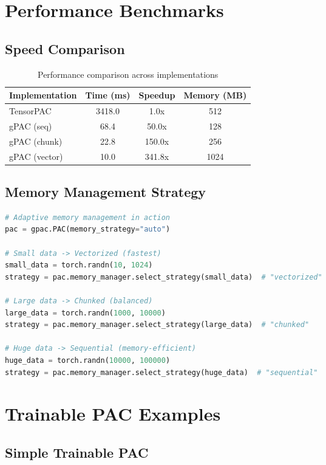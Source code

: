 \documentclass[11pt,a4paper]{article}
\begin{document}
\section{Performance Benchmarks}

\subsection{Speed Comparison}

\begin{table}[h]
\centering
\begin{tabular}{lccc}
\toprule
Implementation & Time (ms) & Speedup & Memory (MB) \\
\midrule
TensorPAC & 3418.0 & 1.0x & 512 \\
gPAC (seq) & 68.4 & 50.0x & 128 \\
gPAC (chunk) & 22.8 & 150.0x & 256 \\
gPAC (vector) & 10.0 & 341.8x & 1024 \\
\bottomrule
\end{tabular}
\caption{Performance comparison across implementations}
\end{table}

\subsection{Memory Management Strategy}

\begin{lstlisting}[language=Python]
# Adaptive memory management in action
pac = gpac.PAC(memory_strategy="auto")

# Small data -> Vectorized (fastest)
small_data = torch.randn(10, 1024)
strategy = pac.memory_manager.select_strategy(small_data)  # "vectorized"

# Large data -> Chunked (balanced)
large_data = torch.randn(1000, 10000)
strategy = pac.memory_manager.select_strategy(large_data)  # "chunked"

# Huge data -> Sequential (memory-efficient)
huge_data = torch.randn(10000, 100000)
strategy = pac.memory_manager.select_strategy(huge_data)  # "sequential"
\end{lstlisting}

\section{Trainable PAC Examples}

\subsection{Simple Trainable PAC}
\end{document}
